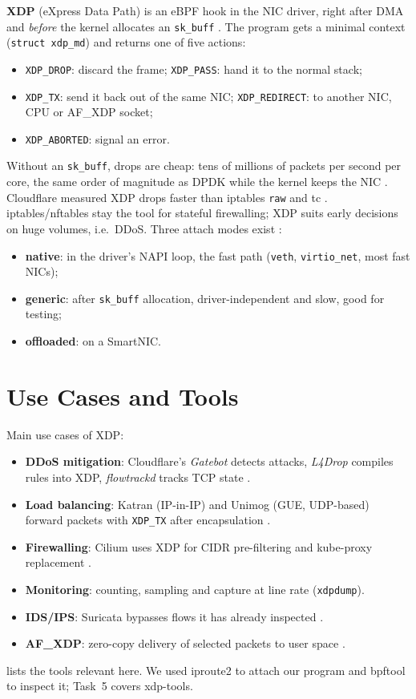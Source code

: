 \textbf{XDP} (eXpress Data Path) is an eBPF hook in the NIC driver, right after DMA and \emph{before} the kernel allocates an \texttt{sk\_buff} \autocite{hoiland2018xdp,ebpfdocs_xdp}. The program gets a minimal context (\texttt{struct xdp\_md}) and returns one of five actions:
\begin{itemize}
	\item \texttt{XDP\_DROP}: discard the frame; \texttt{XDP\_PASS}: hand it to the normal stack;
	\item \texttt{XDP\_TX}: send it back out of the same NIC; \texttt{XDP\_REDIRECT}: to another NIC, CPU or AF\_XDP socket;
	\item \texttt{XDP\_ABORTED}: signal an error.
\end{itemize}
Without an \texttt{sk\_buff}, drops are cheap: tens of millions of packets per second per core, the same order of magnitude as DPDK while the kernel keeps the NIC \autocite{hoiland2018xdp}. Cloudflare measured XDP drops faster than iptables \texttt{raw} and tc \autocite{cf_drop10m}. iptables/nftables stay the tool for stateful firewalling; XDP suits early decisions on huge volumes, i.e.\ DDoS. Three attach modes exist \autocite{ebpfdocs_xdp,cilium_bpfref}:
\begin{itemize}
	\item \textbf{native}: in the driver's NAPI loop, the fast path (\texttt{veth}, \texttt{virtio\_net}, most fast NICs);
	\item \textbf{generic}: after \texttt{sk\_buff} allocation, driver-independent and slow, good for testing;
	\item \textbf{offloaded}: on a SmartNIC.
\end{itemize}

\section{Use Cases and Tools}\label{sec:t4-usecases}\label{sec:t4-tools}
Main use cases of XDP:
\begin{itemize}
	\item \textbf{DDoS mitigation}: Cloudflare's \emph{Gatebot} detects attacks, \emph{L4Drop} compiles rules into XDP, \emph{flowtrackd} tracks TCP state \autocite{cf_gatebot,cf_l4drop,cf_flowtrackd}.
	\item \textbf{Load balancing}: Katran (IP-in-IP) and Unimog (GUE, UDP-based) forward packets with \texttt{XDP\_TX} after encapsulation \autocite{meta_katran,katran_github,cf_unimog}.
	\item \textbf{Firewalling}: Cilium uses XDP for CIDR pre-filtering and kube-proxy replacement \autocite{cilium_kpr,cilium_bpfref}.
	\item \textbf{Monitoring}: counting, sampling and capture at line rate (\texttt{xdpdump}).
	\item \textbf{IDS/IPS}: Suricata bypasses flows it has already inspected \autocite{suricata_ebpf}.
	\item \textbf{AF\_XDP}: zero-copy delivery of selected packets to user space \autocite{kdoc_afxdp}.
\end{itemize}
 lists the tools relevant here. We used iproute2 to attach our program and bpftool to inspect it; Task~5 covers xdp-tools.

